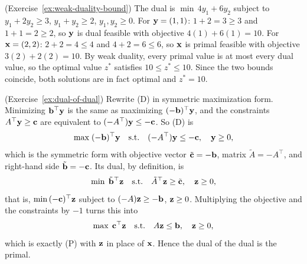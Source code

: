 \begin{solution}(Exercise~\ref{ex:weak-duality-bound})
The dual is $\min\, 4y_1 + 6y_2$ subject to $y_1 + 2y_2 \geq 3$, $y_1 + y_2 \geq 2$, $y_1, y_2 \geq 0$.
For $\mathbf{y} = (1,1)$: $1 + 2 = 3 \geq 3$ and $1 + 1 = 2 \geq 2$, so $\mathbf{y}$ is dual feasible with objective $4(1) + 6(1) = 10$.
For $\mathbf{x} = (2,2)$: $2 + 2 = 4 \leq 4$ and $4 + 2 = 6 \leq 6$, so $\mathbf{x}$ is primal feasible with objective $3(2) + 2(2) = 10$.
By weak duality, every primal value is at most every dual value, so the optimal value $z^*$ satisfies $10 \leq z^* \leq 10$.  Since the two bounds coincide, both solutions are in fact optimal and $z^* = 10$.
\end{solution}

\begin{solution}(Exercise~\ref{ex:dual-of-dual})
Rewrite (D) in symmetric maximization form.  Minimizing $\mathbf{b}^\top \mathbf{y}$ is the same as maximizing $(-\mathbf{b})^\top \mathbf{y}$, and the constraints $A^\top \mathbf{y} \geq \mathbf{c}$ are equivalent to $(-A^\top)\mathbf{y} \leq -\mathbf{c}$.  So (D) is
\[
\max \; (-\mathbf{b})^\top \mathbf{y} \quad \mbox{s.t.} \quad (-A^\top)\mathbf{y} \leq -\mathbf{c}, \quad \mathbf{y} \geq 0,
\]
which is the symmetric form with objective vector $\tilde{\mathbf{c}} = -\mathbf{b}$, matrix $\tilde{A} = -A^\top$, and right-hand side $\tilde{\mathbf{b}} = -\mathbf{c}$.  Its dual, by definition, is
\[
\min \; \tilde{\mathbf{b}}^\top \mathbf{z} \quad \mbox{s.t.} \quad \tilde{A}^\top \mathbf{z} \geq \tilde{\mathbf{c}}, \quad \mathbf{z} \geq 0,
\]
that is, $\min\, (-\mathbf{c})^\top \mathbf{z}$ subject to $(-A)\mathbf{z} \geq -\mathbf{b}$, $\mathbf{z} \geq 0$.  Multiplying the objective and the constraints by $-1$ turns this into
\[
\max \; \mathbf{c}^\top \mathbf{z} \quad \mbox{s.t.} \quad A\mathbf{z} \leq \mathbf{b}, \quad \mathbf{z} \geq 0,
\]
which is exactly (P) with $\mathbf{z}$ in place of $\mathbf{x}$.  Hence the dual of the dual is the primal.
\end{solution}

